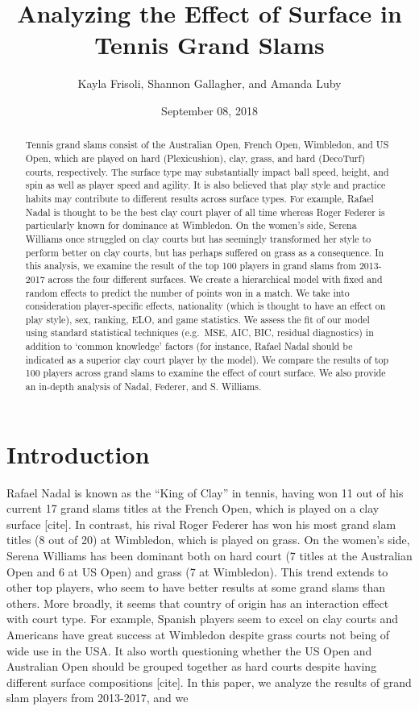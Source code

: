 \documentclass[]{article}
\title{Analyzing the Effect of Surface in Tennis Grand Slams}
\author{Kayla Frisoli, Shannon Gallagher, and Amanda Luby}
\date{September 08, 2018}
\begin{document}
\maketitle
\begin{abstract}
Tennis grand slams consist of the Australian Open, French Open,
Wimbledon, and US Open, which are played on hard (Plexicushion), clay,
grass, and hard (DecoTurf) courts, respectively. The surface type may
substantially impact ball speed, height, and spin as well as player
speed and agility. It is also believed that play style and practice
habits may contribute to different results across surface types. For
example, Rafael Nadal is thought to be the best clay court player of all
time whereas Roger Federer is particularly known for dominance at
Wimbledon. On the women's side, Serena Williams once struggled on clay
courts but has seemingly transformed her style to perform better on clay
courts, but has perhaps suffered on grass as a consequence. In this
analysis, we examine the result of the top 100 players in grand slams
from 2013-2017 across the four different surfaces. We create a
hierarchical model with fixed and random effects to predict the number
of points won in a match. We take into consideration player-specific
effects, nationality (which is thought to have an effect on play style),
sex, ranking, ELO, and game statistics. We assess the fit of our model
using standard statistical techniques (e.g.~MSE, AIC, BIC, residual
diagnostics) in addition to `common knowledge' factors (for instance,
Rafael Nadal should be indicated as a superior clay court player by the
model). We compare the results of top 100 players across grand slams to
examine the effect of court surface. We also provide an in-depth
analysis of Nadal, Federer, and S. Williams.
\end{abstract}

\hypertarget{sec:iintro}{%
\section{Introduction}\label{sec:iintro}}

Rafael Nadal is known as the ``King of Clay'' in tennis, having won 11
out of his current 17 grand slams titles at the French Open, which is
played on a clay surface {[}cite{]}. In contrast, his rival Roger
Federer has won his most grand slam titles (8 out of 20) at Wimbledon,
which is played on grass. On the women's side, Serena Williams has been
dominant both on hard court (7 titles at the Australian Open and 6 at US
Open) and grass (7 at Wimbledon). This trend extends to other top
players, who seem to have better results at some grand slams than
others. More broadly, it seems that country of origin has an interaction
effect with court type. For example, Spanish players seem to excel on
clay courts and Americans have great success at Wimbledon despite grass
courts not being of wide use in the USA. It also worth questioning
whether the US Open and Australian Open should be grouped together as
hard courts despite having different surface compositions {[}cite{]}. In
this paper, we analyze the results of grand slam players from 2013-2017,
and we
\end{document}
